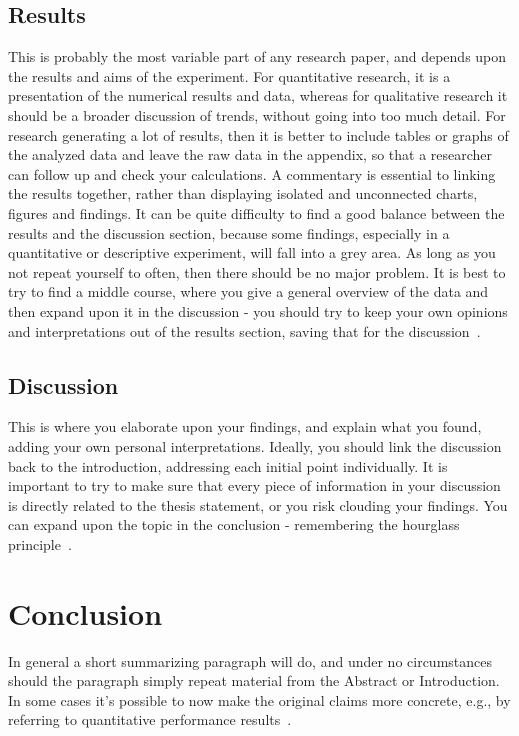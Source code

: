 \documentclass{winslabreport}
\begin{document}
\subsection{Results}
This is probably the most variable part of any research paper, and depends upon the results and aims of the experiment. For quantitative research, it is a presentation of the numerical results and data, whereas for qualitative research it should be a broader discussion of trends, without going into too much detail. For research generating a lot of results, then it is better to include tables or graphs of the analyzed data and leave the raw data in the appendix, so that a researcher can follow up and check your calculations. A commentary is essential to linking the results together, rather than displaying isolated and unconnected charts, figures and findings. It can be quite difficulty to find a good balance between the results and the discussion section, because some findings, especially in a quantitative or descriptive experiment, will fall into a grey area. As long as you not repeat yourself to often, then there should be no major problem. It is best to try to find a middle course, where you give a general overview of the data and then expand upon it in the discussion - you should try to keep your own opinions and interpretations out of the results section, saving that for the discussion~\cite{Shuttleworth2016}.

\subsection{Discussion}
This is where you elaborate upon your findings, and explain what you found, adding your own personal interpretations. Ideally, you should link the discussion back to the introduction, addressing each initial point individually. It is important to try to make sure that every piece of information in your discussion is directly related to the thesis statement, or you risk clouding your findings. You can expand upon the topic in the conclusion - remembering the hourglass principle~\cite{Shuttleworth2016}.


\section{Conclusion}
In general a short summarizing paragraph will do, and under no circumstances should the paragraph simply repeat material from the Abstract or Introduction. In some cases it's possible to now make the original claims more concrete, e.g., by referring to quantitative performance results~\cite{Widom2006}.
\end{document}
